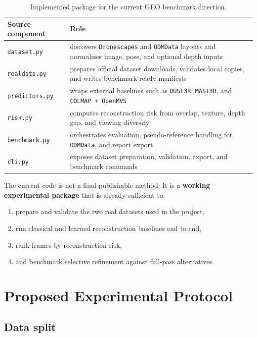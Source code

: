 \documentclass[11pt,a4paper]{article}
\begin{document}
\begin{table}[t]
\centering
\small
\begin{tabularx}{\textwidth}{>{\raggedright\arraybackslash}p{3.1cm} >{\raggedright\arraybackslash}X}
\toprule
\textbf{Source component} & \textbf{Role} \\
\midrule
\texttt{dataset.py} & discovers \texttt{Dronescapes} and \texttt{ODMData} layouts and normalizes image, pose, and optional depth inputs \\
\texttt{realdata.py} & prepares official dataset downloads, validates local copies, and writes benchmark-ready manifests \\
\texttt{predictors.py} & wraps external baselines such as \texttt{DUSt3R}, \texttt{MASt3R}, and \texttt{COLMAP + OpenMVS} \\
\texttt{risk.py} & computes reconstruction risk from overlap, texture, depth gap, and viewing diversity \\
\texttt{benchmark.py} & orchestrates evaluation, pseudo-reference handling for \texttt{ODMData}, and report export \\
\texttt{cli.py} & exposes dataset preparation, validation, export, and benchmark commands \\
\bottomrule
\end{tabularx}
\caption{Implemented package for the current GEO benchmark direction.}
\end{table}

The current code is not a final publishable method. It is a \textbf{working experimental package} that is already sufficient to:
\begin{enumerate}[leftmargin=1.5em]
  \item prepare and validate the two real datasets used in the project,
  \item run classical and learned reconstruction baselines end to end,
  \item rank frames by reconstruction risk,
  \item and benchmark selective refinement against full-pass alternatives.
\end{enumerate}

\section{Proposed Experimental Protocol}

\subsection{Data split}
\end{document}
